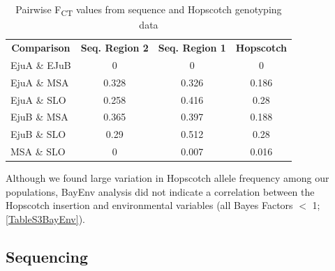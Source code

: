 \documentclass[12pt]{article}
\begin{document}
\begin{table}[htbp]
  \centering
  \caption{Pairwise F\textsubscript{CT} values from sequence and Hopscotch genotyping data}
    \begin{tabular}{lccc}
    \multicolumn{1}{c}{\textbf{Comparison}} & \textbf{Seq. Region 2} & \textbf{Seq.  Region 1} & \textbf{Hopscotch} \\
    EjuA \& EJuB & 0     & 0     & 0 \\
    EjuA \& MSA & 0.328 & 0.326 & 0.186 \\
    EjuA \& SLO & 0.258 & 0.416 & 0.28 \\
    EjuB \& MSA & 0.365 & 0.397 & 0.188 \\
    EjuB \& SLO & 0.29  & 0.512 & 0.28 \\
    MSA \& SLO & 0     & 0.007 & 0.016 \\
    \end{tabular}
  \label{Table1Fst}
\end{table}
Although we found large variation in Hopscotch allele frequency among our populations, BayEnv analysis did not indicate a correlation between the Hopscotch insertion and environmental variables (all Bayes Factors $<$ 1; \ref{TableS3BayEnv}). 

\subsection*{Sequencing}
\end{document}
